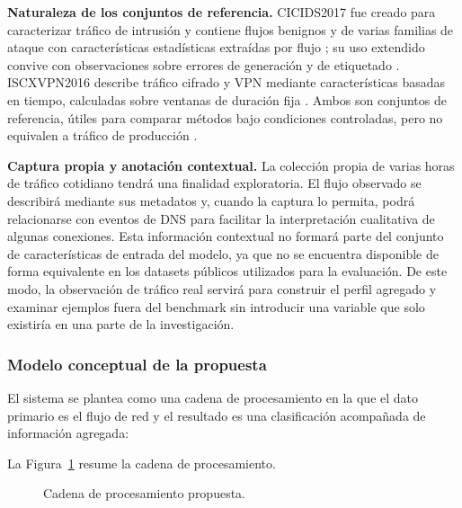 \documentclass[conference]{IEEEtran}
\begin{document}
\textbf{Naturaleza de los conjuntos de referencia.} CICIDS2017 fue creado para caracterizar tráfico de intrusión y contiene flujos benignos y de varias familias de ataque con características estadísticas extraídas por flujo \cite{sharafaldin2018}; su uso extendido convive con observaciones sobre errores de generación y de etiquetado \cite{engelen2021}. ISCXVPN2016 describe tráfico cifrado y VPN mediante características basadas en tiempo, calculadas sobre ventanas de duración fija \cite{drapergil2016}. Ambos son conjuntos de referencia, útiles para comparar métodos bajo condiciones controladas, pero no equivalen a tráfico de producción \cite{ring2019}.

\textbf{Captura propia y anotación contextual.} La colección propia de varias horas de tráfico cotidiano tendrá una finalidad exploratoria. El flujo observado se describirá mediante sus metadatos y, cuando la captura lo permita, podrá relacionarse con eventos de DNS para facilitar la interpretación cualitativa de algunas conexiones. Esta información contextual no formará parte del conjunto de características de entrada del modelo, ya que no se encuentra disponible de forma equivalente en los datasets públicos utilizados para la evaluación. De este modo, la observación de tráfico real servirá para construir el perfil agregado y examinar ejemplos fuera del benchmark sin introducir una variable que solo existiría en una parte de la investigación.

\subsubsection{Modelo conceptual de la propuesta}

El sistema se plantea como una cadena de procesamiento en la que el dato primario es el flujo de red y el resultado es una clasificación acompañada de información agregada:

La Figura~\ref{fig:pipeline} resume la cadena de procesamiento.

\begin{figure}[!t]
\centering
{}
\caption{Cadena de procesamiento propuesta.}
\label{fig:pipeline}
\end{figure}
\end{document}
